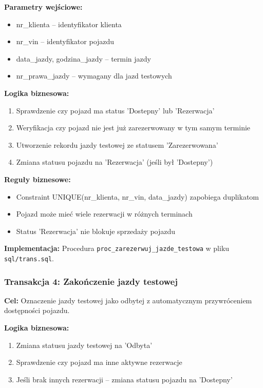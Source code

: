 \documentclass[a4paper,titleauthor]{mwart}
\begin{document}
	\textbf{Parametry wejściowe:}
	\begin{itemize}
		\item nr\_klienta -- identyfikator klienta
		\item nr\_vin -- identyfikator pojazdu
		\item data\_jazdy, godzina\_jazdy -- termin jazdy
		\item nr\_prawa\_jazdy -- wymagany dla jazd testowych
	\end{itemize}

	\textbf{Logika biznesowa:}
	\begin{enumerate}
		\item Sprawdzenie czy pojazd ma status 'Dostepny' lub 'Rezerwacja'
		\item Weryfikacja czy pojazd nie jest już zarezerwowany w tym samym terminie
		\item Utworzenie rekordu jazdy testowej ze statusem 'Zarezerwowana'
		\item Zmiana statusu pojazdu na 'Rezerwacja' (jeśli był 'Dostepny')
	\end{enumerate}

	\textbf{Reguły biznesowe:}
	\begin{itemize}
		\item Constraint UNIQUE(nr\_klienta, nr\_vin, data\_jazdy) zapobiega duplikatom
		\item Pojazd może mieć wiele rezerwacji w różnych terminach
		\item Status 'Rezerwacja' nie blokuje sprzedaży pojazdu
	\end{itemize}

	\textbf{Implementacja:} Procedura \texttt{proc\_zarezerwuj\_jazde\_testowa} w pliku \texttt{sql/trans.sql}.

	\subsubsection{Transakcja 4: Zakończenie jazdy testowej}

	\textbf{Cel:} Oznaczenie jazdy testowej jako odbytej z automatycznym przywróceniem dostępności pojazdu.

	\textbf{Logika biznesowa:}
	\begin{enumerate}
		\item Zmiana statusu jazdy testowej na 'Odbyta'
		\item Sprawdzenie czy pojazd ma inne aktywne rezerwacje
		\item Jeśli brak innych rezerwacji -- zmiana statusu pojazdu na 'Dostepny'
	\end{enumerate}
\end{document}
